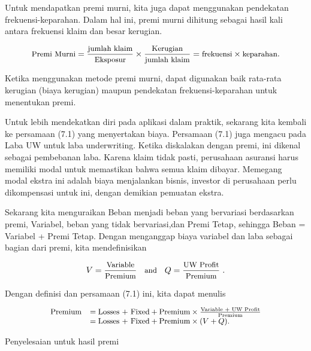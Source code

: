 \documentclass[
]{book}
\begin{document}
Untuk mendapatkan premi murni, kita juga dapat menggunakan pendekatan frekuensi-keparahan. Dalam hal ini, premi murni dihitung sebagai hasil kali antara frekuensi klaim dan besar kerugian.

\begin{equation}
\small{
\text{Premi Murni} = \frac{\text{jumlah klaim}}{\text{Eksposur}} \times \frac{\text{Kerugian}}{\text{jumlah klaim}} = \text{frekuensi} \times \text{keparahan}.
}
\end{equation}

Ketika menggunakan metode premi murni, dapat digunakan baik rata-rata kerugian (biaya kerugian) maupun pendekatan frekuensi-keparahan untuk menentukan premi.

Untuk lebih mendekatkan diri pada aplikasi dalam praktik, sekarang kita kembali ke persamaan (7.1) yang menyertakan biaya. Persamaan (7.1) juga mengacu pada Laba UW untuk laba underwriting. Ketika diskalakan dengan premi, ini dikenal sebagai pembebanan laba. Karena klaim tidak pasti, perusahaan asuransi harus memiliki modal untuk memastikan bahwa semua klaim dibayar. Memegang modal ekstra ini adalah biaya menjalankan bisnis, investor di perusahaan perlu dikompensasi untuk ini, dengan demikian pemuatan ekstra.

Sekarang kita menguraikan Beban menjadi beban yang bervariasi berdasarkan premi, Variabel, beban yang tidak bervariasi,dan Premi Tetap, sehingga Beban = Variabel + Premi Tetap. Dengan menganggap biaya variabel dan laba sebagai bagian dari premi, kita mendefinisikan

\begin{equation}
\small{
V =  \frac{\text{Variable}}{\text{Premium}} ~~~ \text{and}~~~
Q = \frac{\text{UW Profit}}{\text{Premium}} ~.
}
\end{equation}

Dengan definisi dan persamaan (7.1) ini, kita dapat menulis

\begin{equation}
\small{
\begin{matrix}
\begin{array}{ll}
\text{Premium} &= \text{Losses + Fixed} + \text{Premium} \times \frac{\text{Variable + UW Profit}}{\text{Premium}}  \\
& = \text{Losses + Fixed} + \text{Premium} \times (V+Q) .
\end{array}
\end{matrix}
}
\end{equation}

Penyelesaian untuk hasil premi
\end{document}
